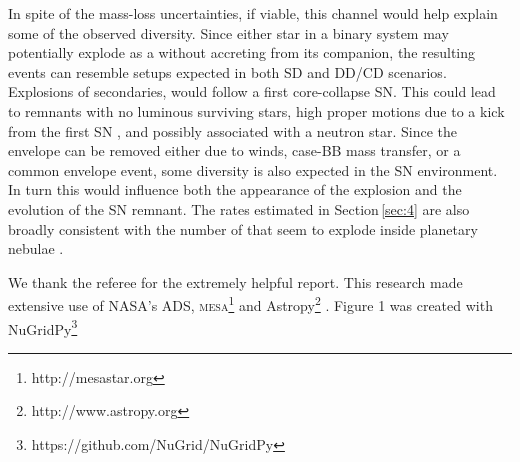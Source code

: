 \documentclass[twocolumn]{aa}
\begin{document}
In spite of the mass-loss 
uncertainties, if viable, this channel would help explain some of the observed \ia diversity. Since either star in a binary system may potentially explode 
as a \ia without accreting from its  companion, the resulting events can resemble setups expected in both SD and DD/CD scenarios. Explosions of 
secondaries, would follow a first core-collapse SN. This 
could lead to \ia remnants with no luminous surviving stars, high proper motions due to a kick from the first SN \cite[like the Kepler SN remnant,][]{Chiotellis:2011jy}, and  possibly associated with a neutron star. 
Since the  envelope can be removed either due to winds, case-BB mass transfer, or a common envelope event, some diversity is also expected in 
the SN environment. In turn this would influence both the 
appearance of the explosion and the evolution of the SN remnant. The rates estimated in Section\,\ref{sec:4} are also broadly consistent with the 
number of \ias that seem to explode inside planetary 
nebulae \citep[$\sim 20\%$;][]{Tsebrenko:2014kea}.  
          



\begin{acknowledgements}
We thank the referee for the extremely helpful report. 
 This research made extensive use of NASA's ADS, \textsc{mesa}\footnote{http://mesastar.org} \citep{Paxton:2010ji,Paxton:2013pj,Paxton:2015jva,Paxton:2017eie} and Astropy\footnote{http://www.astropy.org} \citep{Price-Whelan:2018hus}. Figure 1 was created with NuGridPy\footnote{https://github.com/NuGrid/NuGridPy}
\end{acknowledgements}


 

\end{document}
